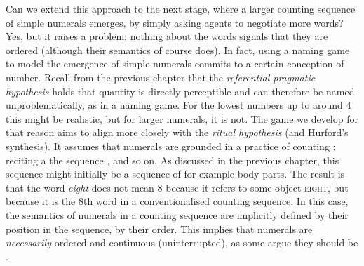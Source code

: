 \documentclass{../src/bcthesispart}
\begin{document}
Can we extend this approach to the next stage, where a larger counting sequence of simple numerals emerges, by simply asking agents to negotiate more words?
Yes, but it raises a problem: nothing about the words signals that they are ordered (although their semantics of course does).
In fact, using a naming game to model the emergence of simple numerals commits to a certain conception of number.
Recall from the previous chapter that the \emph{referential-pragmatic hypothesis} holds that quantity is directly perceptible and can therefore be named unproblematically, as in a naming game.
For the lowest numbers up to around 4 this might be realistic, but for larger numerals, it is not.
The game we develop for that reason aims to align more closely with the \emph{ritual hypothesis} (and Hurford’s synthesis).
It assumes that numerals are grounded in a practice of counting \parencite{Hurford2007}: reciting a the sequence , and so on. 
As discussed in the previous chapter, this sequence might initially be a sequence of for example body parts.
The result is that the word \emph{eight} does not mean 8 because it refers to some object \textsc{eight}, but because it is the 8th word in a conventionalised counting sequence.
In this case, the semantics of numerals in a counting sequence are implicitly defined by their position in the sequence, by their order.
This implies that numerals are \emph{necessarily} ordered and continuous (uninterrupted), as some argue they should be \parencite{VonMengden2008}.
\end{document}
